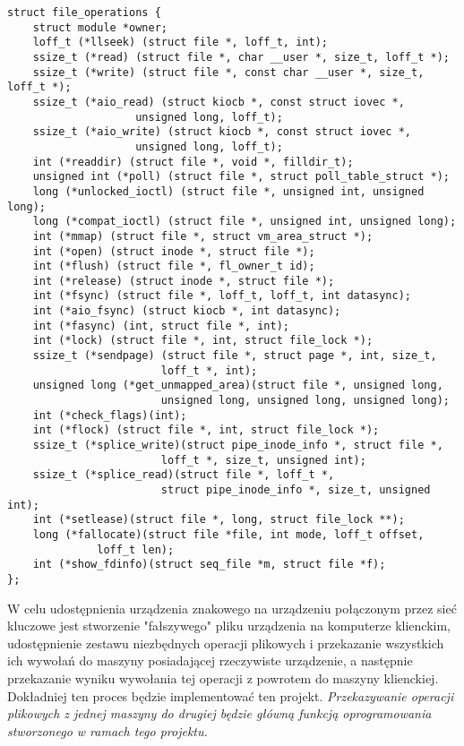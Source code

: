 \documentclass[10pt]{article}
\begin{document}
\newpage
\begin{verbatim}
struct file_operations {
    struct module *owner;
    loff_t (*llseek) (struct file *, loff_t, int);
    ssize_t (*read) (struct file *, char __user *, size_t, loff_t *);
    ssize_t (*write) (struct file *, const char __user *, size_t, loff_t *);
    ssize_t (*aio_read) (struct kiocb *, const struct iovec *,
                    unsigned long, loff_t);
    ssize_t (*aio_write) (struct kiocb *, const struct iovec *,
                    unsigned long, loff_t);
    int (*readdir) (struct file *, void *, filldir_t);
    unsigned int (*poll) (struct file *, struct poll_table_struct *);
    long (*unlocked_ioctl) (struct file *, unsigned int, unsigned long);
    long (*compat_ioctl) (struct file *, unsigned int, unsigned long);
    int (*mmap) (struct file *, struct vm_area_struct *);
    int (*open) (struct inode *, struct file *);
    int (*flush) (struct file *, fl_owner_t id);
    int (*release) (struct inode *, struct file *);
    int (*fsync) (struct file *, loff_t, loff_t, int datasync);
    int (*aio_fsync) (struct kiocb *, int datasync);
    int (*fasync) (int, struct file *, int);
    int (*lock) (struct file *, int, struct file_lock *);
    ssize_t (*sendpage) (struct file *, struct page *, int, size_t,
                        loff_t *, int);
    unsigned long (*get_unmapped_area)(struct file *, unsigned long,
                        unsigned long, unsigned long, unsigned long);
    int (*check_flags)(int);
    int (*flock) (struct file *, int, struct file_lock *);
    ssize_t (*splice_write)(struct pipe_inode_info *, struct file *,
                        loff_t *, size_t, unsigned int);
    ssize_t (*splice_read)(struct file *, loff_t *,
                        struct pipe_inode_info *, size_t, unsigned int);
    int (*setlease)(struct file *, long, struct file_lock **);
    long (*fallocate)(struct file *file, int mode, loff_t offset,
              loff_t len);
    int (*show_fdinfo)(struct seq_file *m, struct file *f);
};
\end{verbatim}

W celu udostępnienia urządzenia znakowego na urządzeniu połączonym przez sieć kluczowe jest stworzenie "fałszywego" pliku urządzenia na komputerze klienckim, udostępnienie zestawu niezbędnych operacji plikowych i przekazanie wszystkich ich wywołań do maszyny posiadającej rzeczywiste urządzenie, a następnie przekazanie wyniku wywołania tej operacji z powrotem do maszyny klienckiej. Dokładniej ten proces będzie implementować ten projekt. \emph{Przekazywanie operacji plikowych z jednej maszyny do drugiej będzie główną funkcją oprogramowania stworzonego w ramach tego projektu.}
\end{document}
